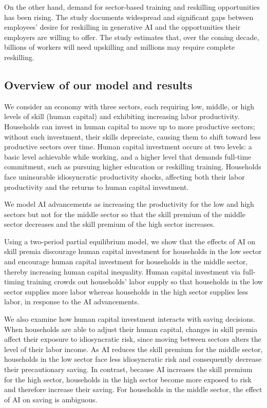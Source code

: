 \documentclass[12pt]{article}
\begin{document}
On the other hand, demand for sector-based training and reskilling opportunities has been rising. The \citet{oliwyman2024} study documents widespread and significant gaps between employees’ desire for reskilling in generative AI and the opportunities their employers are willing to offer. The study estimates that, over the coming decade, billions of workers will need upskilling and millions may require complete reskilling.

\subsection{Overview of our model and results}



We consider an economy with three sectors, each requiring low, middle, or high levels of skill (human capital) and exhibiting increasing labor productivity. Households can invest in human capital to move up to more productive sectors; without such investment, their skills depreciate, causing them to shift toward less productive sectors over time. Human capital investment occurs at two levels: a basic level achievable while working, and a higher level that demands full-time commitment, such as pursuing higher education or reskilling training. Households face uninsurable idiosyncratic productivity shocks, affecting both their labor productivity and the returns to human capital investment.

We model AI advancements as increasing the productivity for the low and high sectors but not for the middle sector so that the skill premium of the middle sector decreases and the skill premium of the high sector increases. 

Using a two-period partial equilibrium model, we show that the effects of AI on skill premia discourage human capital investment for households in the low sector and encourage human capital investment for households in the middle sector, thereby increasing human capital inequality. Human capital investment via full-timing training crowds out households' labor supply so that households in the low sector supplies more labor whereas households in the high sector supplies less labor, in response to the AI advancements. 

We also examine how human capital investment interacts with saving decisions. When households are able to adjust their human capital, changes in skill premia affect their exposure to idiosyncratic risk, since moving between sectors alters the level of their labor income. As AI reduces the skill premium for the middle sector, households in the low sector face less idiosyncratic risk and consequently decrease their precautionary saving. In contrast, because AI increases the skill premium for the high sector, households in the high sector become more exposed to risk and therefore increase their saving. For households in the middle sector, the effect of AI on saving is ambiguous.
\end{document}
